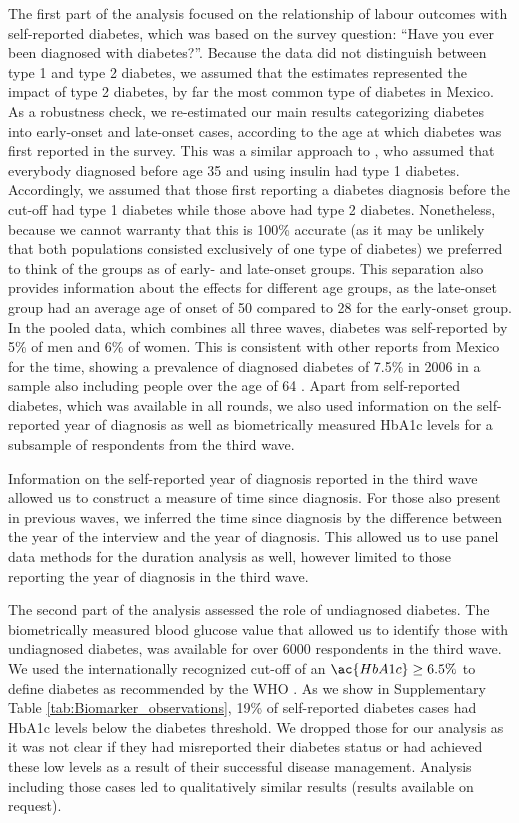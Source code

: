 \documentclass[12pt,english]{article}
\begin{document}
The first part of the analysis focused on the relationship of labour outcomes with self-reported diabetes, which was based on the survey question: “Have you ever been diagnosed with diabetes?”. Because the data did not distinguish between type 1 and type 2 diabetes, we assumed that the estimates represented the impact of type 2 diabetes, by far the most common type of diabetes in Mexico. As a robustness check, we re-estimated our main results categorizing diabetes into early-onset and late-onset cases, according to the age at which diabetes was first reported in the survey. This was a similar approach to \textcite{Alegre-Diaz2016}, who assumed that everybody diagnosed before age 35 and using insulin had type 1 diabetes. Accordingly, we assumed that those first reporting a diabetes diagnosis before the cut-off had type 1 diabetes while those above had type 2 diabetes. Nonetheless, because we cannot warranty that this is 100\% accurate (as it may be unlikely that both populations consisted exclusively of one type of diabetes) we preferred to think of the groups as of early- and late-onset groups. This separation also provides information about the effects for different age groups, as the late-onset group had an average age of onset of 50 compared to 28 for the early-onset group. In the pooled data, which combines all three waves, diabetes was self-reported by 5\% of men and 6\% of women. This is consistent with other reports from Mexico for the time, showing a prevalence of diagnosed diabetes of 7.5\% in 2006 in a sample also including people over the age of 64 \parencite{Barquera2013}. Apart from self-reported diabetes, which was available in all rounds, we also used information on the self-reported year of diagnosis as well as biometrically measured \ac{HbA1c} levels for a subsample of respondents from the third wave.


Information on the self-reported year of diagnosis reported in the third wave allowed us to construct a measure of time since diagnosis. For those also present in previous waves, we inferred the time since diagnosis by the difference between the year of the interview and the year of diagnosis. This allowed us to use panel data methods for the duration analysis as well, however limited to those reporting the year of diagnosis in the third wave. 

The second part of the analysis assessed the role of undiagnosed diabetes. The biometrically measured blood glucose value that allowed us to identify those with undiagnosed diabetes, was available for over 6000 respondents in the third wave. We used the internationally recognized cut-off of an $\ac{HbA1c} \geq 6.5\%$ to define diabetes as recommended by the \ac{WHO} \parencite{WorldHealthOrganization2011}.  As we show in Supplementary Table \ref{tab:Biomarker_observations}, 19\% of self-reported diabetes cases had \ac{HbA1c} levels below the diabetes threshold. We dropped those for our analysis as it was not clear if they had misreported their diabetes status or had achieved these low levels as a result of their successful disease management. Analysis including those cases led to qualitatively similar results (results available on request).
\end{document}
